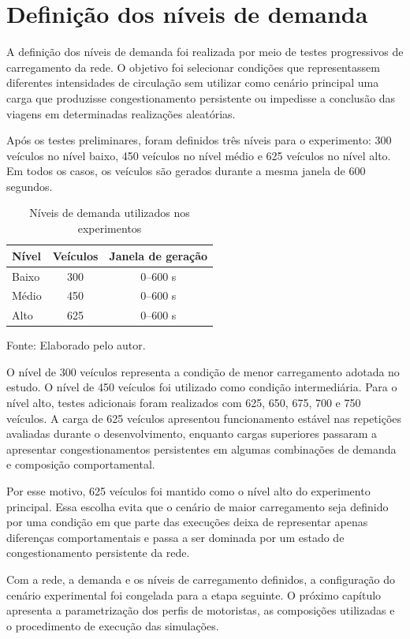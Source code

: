\section{Definição dos níveis de demanda}

A definição dos níveis de demanda foi realizada por meio de testes progressivos de carregamento da rede. O objetivo foi selecionar condições que representassem diferentes intensidades de circulação sem utilizar como cenário principal uma carga que produzisse congestionamento persistente ou impedisse a conclusão das viagens em determinadas realizações aleatórias.

Após os testes preliminares, foram definidos três níveis para o experimento: 300 veículos no nível baixo, 450 veículos no nível médio e 625 veículos no nível alto. Em todos os casos, os veículos são gerados durante a mesma janela de 600 segundos.

\begin{table}[H]
\centering
\caption{Níveis de demanda utilizados nos experimentos}
\label{tab:niveis-demanda}
\small
\renewcommand{\arraystretch}{1.20}
\begin{tabular}{|p{5cm}|c|c|}
\hline
\textbf{Nível} & \textbf{Veículos} & \textbf{Janela de geração} \\
\hline
Baixo & 300 & 0--600 s \\
\hline
Médio & 450 & 0--600 s \\
\hline
Alto & 625 & 0--600 s \\
\hline
\end{tabular}

\par\vspace{0.25cm}
\begin{minipage}{\textwidth}
\footnotesize Fonte: Elaborado pelo autor.
\end{minipage}
\end{table}

O nível de 300 veículos representa a condição de menor carregamento adotada no estudo. O nível de 450 veículos foi utilizado como condição intermediária. Para o nível alto, testes adicionais foram realizados com 625, 650, 675, 700 e 750 veículos. A carga de 625 veículos apresentou funcionamento estável nas repetições avaliadas durante o desenvolvimento, enquanto cargas superiores passaram a apresentar congestionamentos persistentes em algumas combinações de demanda e composição comportamental.

Por esse motivo, 625 veículos foi mantido como o nível alto do experimento principal. Essa escolha evita que o cenário de maior carregamento seja definido por uma condição em que parte das execuções deixa de representar apenas diferenças comportamentais e passa a ser dominada por um estado de congestionamento persistente da rede.

Com a rede, a demanda e os níveis de carregamento definidos, a configuração do cenário experimental foi congelada para a etapa seguinte. O próximo capítulo apresenta a parametrização dos perfis de motoristas, as composições utilizadas e o procedimento de execução das simulações.
